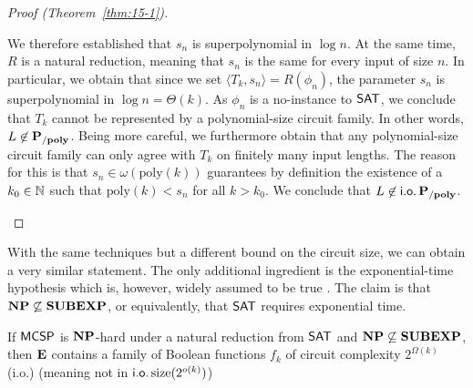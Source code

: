 \documentclass[11pt]{article}
\begin{document}
\begin{proof}[Proof (Theorem~\ref{thm:15-1})]
\begin{itemize}
\begin{enumerate}[(i)]
          We therefore established that $s_n$ is superpolynomial in $\log n$.
          At the same time, $R$ is a natural reduction, meaning that $s_n$ is
          the same for every input of size $n$.
          In particular, we obtain that since we set
          $\langle T_k, s_n \rangle = R(\phi_n)$, the parameter
          $s_n$ is superpolynomial in $\log n = \Theta(k)$.
          As $\phi_n$ is a no-instance to $\mathsf{SAT}$, we conclude that
          $T_k$ cannot be represented by a polynomial-size circuit family.
          In other words, $L \not\in \mathbf{P_{/poly}}$.
          Being more careful, we furthermore obtain that any polynomial-size
          circuit family can only agree with $T_k$ on finitely many
          input lengths. The reason for this is that
          $s_n \in \omega(\mathrm{poly}(k))$ guarantees
          by definition the existence of a $k_0 \in {\mathbb{N}}$ such that
          $\mathrm{poly}(k) < s_n$ for all $k > k_0$.
          We conclude that $L \not\in \mathsf{i.o.}\, \mathbf{P_{/poly}}$.
      \end{enumerate}
	\end{itemize}
\end{proof}

With the same techniques but a different bound on the circuit size, we can
obtain a very similar statement. The only additional ingredient is
the exponential-time hypothesis which is, however, widely assumed to
be true \cite{impagliazzo99}.
The claim is that $\mathbf{NP} \not\subseteq \mathbf{SUBEXP}$, or equivalently, that
$\mathsf{SAT}$ requires exponential time.

\begin{theorem}[\cite{10.1145/335305.335314}]
  \label{thm:15-2}
  If $\mathsf{MCSP}$ is $\mathbf{NP}$-hard under a natural reduction from
  $\mathsf{SAT}$ and $\mathbf{NP} \not\subseteq \mathbf{SUBEXP}$, then
  $\mathbf{E}$ contains a family of Boolean functions
  $f_k$ of circuit complexity $2^{\Omega(k)}$ (i.o.)
  {\color{gray}(meaning not in $\mathsf{i.o.}\, \mathrm{size}(2^{o(k)})$)}
\end{theorem}
\end{document}

